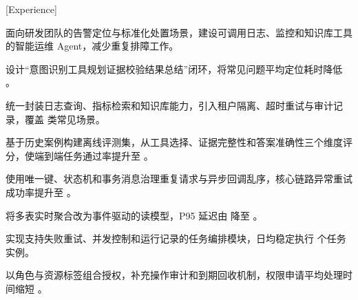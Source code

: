 [Experience]


面向研发团队的告警定位与标准化处置场景，建设可调用日志、监控和知识库工具的智能运维 Agent，减少重复排障工作。\par
\vspace{0.9mm}
\begin{resumelist}
  \item {}设计“意图识别\arrow 工具规划\arrow 证据校验\arrow 结果总结”闭环，将常见问题平均定位耗时降低 。
  \item {}统一封装日志查询、指标检索和知识库能力，引入租户隔离、超时重试与审计记录，覆盖  类常见场景。
  \item {}基于历史案例构建离线评测集，从工具选择、证据完整性和答案准确性三个维度评分，使端到端任务通过率提升至 。
\end{resumelist}

\begin{resumelist}
  \item {}使用唯一键、状态机和事务消息治理重复请求与异步回调乱序，核心链路异常重试成功率提升至 。
  \item {}将多表实时聚合改为事件驱动的读模型，P95 延迟由  降至 。
\end{resumelist}

\vspace{1.8mm}

\begin{resumelist}
  \item {}实现支持失败重试、并发控制和运行记录的任务编排模块，日均稳定执行  个任务实例。
  \item {}以角色与资源标签组合授权，补充操作审计和到期回收机制，权限申请平均处理时间缩短 。
\end{resumelist}

